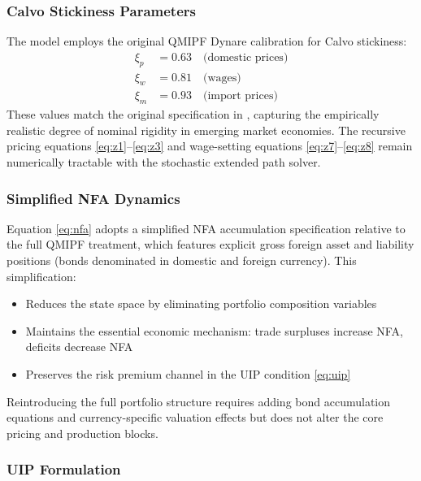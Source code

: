 \documentclass[12pt]{article}
\begin{document}
\subsubsection{Calvo Stickiness Parameters}

The model employs the original QMIPF Dynare calibration for Calvo stickiness:
\begin{align*}
\xi_p &= 0.63 \quad \text{(domestic prices)} \\
\xi_w &= 0.81 \quad \text{(wages)} \\
\xi_m &= 0.93 \quad \text{(import prices)}
\end{align*}
These values match the original specification in \citet{adrian2021quantitative}, capturing the empirically realistic degree of nominal rigidity in emerging market economies. The recursive pricing equations \eqref{eq:z1}--\eqref{eq:z3} and wage-setting equations \eqref{eq:z7}--\eqref{eq:z8} remain numerically tractable with the stochastic extended path solver.

\subsubsection{Simplified NFA Dynamics}

Equation \eqref{eq:nfa} adopts a simplified NFA accumulation specification relative to the full QMIPF treatment, which features explicit gross foreign asset and liability positions (bonds denominated in domestic and foreign currency). This simplification:
\begin{itemize}
\item Reduces the state space by eliminating portfolio composition variables
\item Maintains the essential economic mechanism: trade surpluses increase NFA, deficits decrease NFA
\item Preserves the risk premium channel in the UIP condition \eqref{eq:uip}
\end{itemize}
Reintroducing the full portfolio structure requires adding bond accumulation equations and currency-specific valuation effects but does not alter the core pricing and production blocks.

\subsubsection{UIP Formulation}
\end{document}
